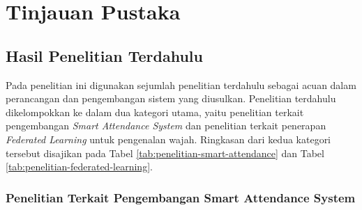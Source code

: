\chapter{Tinjauan Pustaka}
\label{chap:tinjauan-pustaka}

\section{Hasil Penelitian Terdahulu}
\label{sec:hasil-penelitian-terdahulu}

Pada penelitian ini digunakan sejumlah penelitian terdahulu sebagai acuan dalam perancangan dan pengembangan sistem yang diusulkan. Penelitian terdahulu dikelompokkan ke dalam dua kategori utama, yaitu penelitian terkait pengembangan \textit{Smart Attendance System} dan penelitian terkait penerapan \textit{Federated Learning} untuk pengenalan wajah. Ringkasan dari kedua kategori tersebut disajikan pada Tabel \ref{tab:penelitian-smart-attendance} dan Tabel \ref{tab:penelitian-federated-learning}.

\subsection{Penelitian Terkait Pengembangan Smart Attendance System}
\label{subsec:penelitian-smart-attendance}

